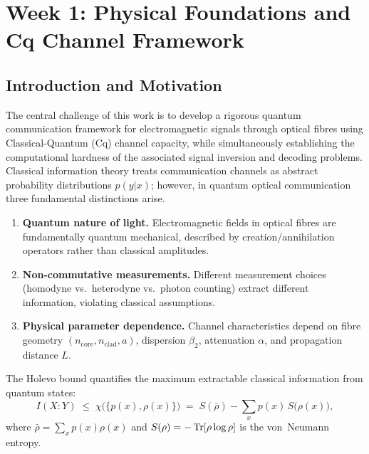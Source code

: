 \documentclass[12pt,a4paper]{article}
\theoremstyle{definition}
\theoremstyle{plain}
\begin{document}
\tableofcontents
\newpage

\section{Week 1: Physical Foundations and Cq Channel Framework}

\subsection{Introduction and Motivation}

The central challenge of this work is to develop a rigorous quantum communication
framework for electromagnetic signals through optical fibres using Classical-Quantum (Cq)
channel capacity, while simultaneously establishing the computational hardness of the
associated signal inversion and decoding problems. Classical information theory treats
communication channels as abstract probability distributions $p(y|x)$; however, in quantum
optical communication three fundamental distinctions arise.

\begin{enumerate}[leftmargin=*, label=(\roman*)]
  \item \textbf{Quantum nature of light.} Electromagnetic fields in optical fibres are
    fundamentally quantum mechanical, described by creation/annihilation operators rather
    than classical amplitudes.
  \item \textbf{Non-commutative measurements.} Different measurement choices
    (homodyne vs.\ heterodyne vs.\ photon counting) extract different information,
    violating classical assumptions.
  \item \textbf{Physical parameter dependence.} Channel characteristics depend on
    fibre geometry $(n_{\mathrm{core}},n_{\mathrm{clad}},a)$, dispersion $\beta_2$,
    attenuation $\alpha$, and propagation distance $L$.
\end{enumerate}

The Holevo bound \cite{holevo1973} quantifies the maximum extractable classical information
from quantum states:
\begin{equation}
I(X:Y) \;\le\; \chi\bigl(\{p(x),\rho(x)\}\bigr)
  \;=\; S(\bar\rho) - \sum_x p(x)\,S\bigl(\rho(x)\bigr),
\label{eq:holevo_bound}
\end{equation}
where $\bar\rho = \sum_x p(x)\rho(x)$ and $S(\rho)=-\Tr[\rho\log\rho]$ is the von~Neumann
entropy.
\end{document}
